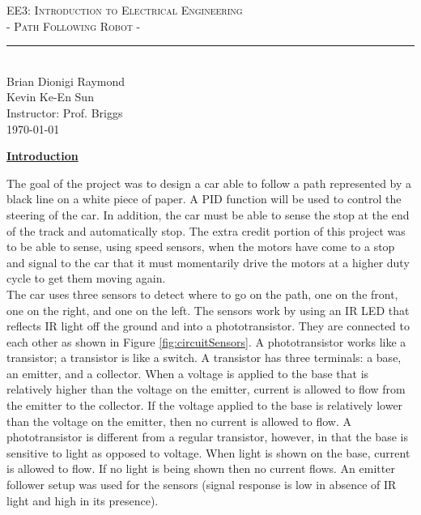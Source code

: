 \documentclass[twocolumn]{article}
\newcommand{\classname}{EE3: Introduction to Electrical Engineering}
\newcommand{\project}{- Path Following Robot -}
\newcommand{\authorname}{Brian Dionigi Raymond\\Kevin Ke-En Sun}
\newcommand{\instructor}{Prof. Briggs}
\newcommand{\sectionTitle}[1]{ {\large\textbf{\uline{#1}}} \\ \vspace{1.5em} }
\begin{document}
		
	\begin{center}
		{\LARGE \textsc{\classname \\ \project} \\ \vspace{4pt}}
		\rule[13pt]{0.5\textwidth}{1pt} \\ %
		{\authorname \\ \vspace{2pt}
			Instructor: \instructor \\ \vspace{2pt}
			\today \\ \vspace{2pt}
		}
	\end{center}	
	
	\begin{flushleft}
		\sectionTitle{Introduction}
		
		\hspace{1em}The goal of the project was to design a car able to follow a path represented by a black line on a white piece of paper. A PID function will be used to control the steering of the car. In addition, the car must be able to sense the stop at the end of the track and automatically stop. The extra credit portion of this project was to be able to sense, using speed sensors, when the motors have come to a stop and signal to the car that it must momentarily drive the motors at a higher duty cycle to get them moving again. \\
		\hspace{1em} The car uses three sensors to detect where to go on the path, one on the front, one on the right, and one on the left. The sensors work by using an IR LED that reflects IR light off the ground and into a phototransistor. They are connected to each other as shown in Figure \ref{fig:circuitSensors}. A phototransistor works like a transistor; a transistor is like a switch. A transistor has three terminals: a base, an emitter, and a collector. When a voltage is applied to the base that is relatively higher than the voltage on the emitter, current is allowed to flow from the emitter to the collector. If the voltage applied to the base is relatively lower than the voltage on the emitter, then no current is allowed to flow. A phototransistor is different from a regular transistor, however, in that the base is sensitive to light as opposed to voltage. When light is shown on the base, current is allowed to flow. If no light is being shown then no current flows. An emitter follower setup was used for the sensors (signal response is low in absence of IR light and high in its presence). \\ \vspace{1em}
		

\end{flushleft}
\end{document}
